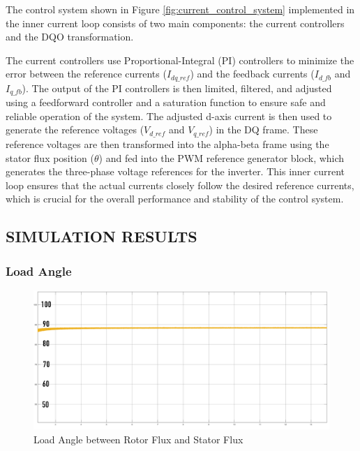 The control system shown in Figure \ref{fig:current_control_system} implemented in the inner current loop consists of two main components: the current controllers and the DQO transformation.

The current controllers use Proportional-Integral (PI) controllers to minimize the error between the reference currents ($I_{dq\_{ref}}$) and the feedback currents ($I_{d\_fb}$ and $I_{q\_fb}$). The output of the PI controllers is then limited, filtered, and adjusted using a feedforward controller and a saturation function to ensure safe and reliable operation of the system. The adjusted d-axis current is then used to generate the reference voltages ($V_{d\_{ref}}$ and $V_{q\_{ref}}$) in the DQ frame. These reference voltages are then transformed into the alpha-beta frame using the stator flux position ($\theta$) and fed into the PWM reference generator block, which generates the three-phase voltage references for the inverter. This inner current loop ensures that the actual currents closely follow the desired reference currents, which is crucial for the overall performance and stability of the control system.



\subsection{SIMULATION RESULTS}


\subsubsection{Load Angle}


\begin{figure}[H]
	\centering
	\includegraphics[width=7in]{sections/section3/images/simulationResutls/LoadAngle.png}
	\caption{Load Angle between Rotor Flux and Stator Flux}
	\label{fig:load_angle_1}
\end{figure}

